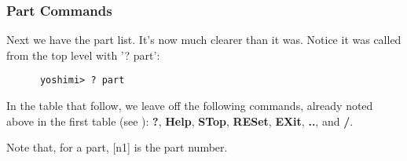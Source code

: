 \subsubsection{Part Commands}
\label{subsec:command_line_part_command_list}

   Next we have the part list. It's now much clearer than it was.
   Notice it was called from the top level with '? part':

   \begin{verbatim}
      yoshimi> ? part
   \end{verbatim}

   In the table that follow, we leave off the following commands, already noted
   above in the first table
   (see ):
   \textbf{?}, \textbf{Help}, \textbf{STop}, \textbf{RESet},
   \textbf{EXit}, \textbf{..}, and \textbf{/}.

   Note that, for a part, [n1] is the part number.

